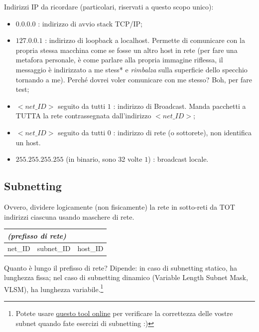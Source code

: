 \noindent Indirizzi IP da ricordare (particolari, riservati a questo scopo unico):
\begin{itemize}
    \item $0.0.0.0$ : indirizzo di avvio stack TCP/IP;
    \item $127.0.0.1$ : indirizzo di loopback a localhost. Permette di comunicare con la propria stessa macchina come se fosse un altro host in rete (per fare una metafora personale, è come parlare alla propria immagine riflessa, il messaggio è indirizzato a me stess* e \textit{rimbalza} sulla superficie dello specchio tornando a me). Perché dovrei voler comunicare con me stesso? Boh, per fare test;
    \item $<net\_ID>$ seguito da tutti $1$ : indirizzo di Broadcast. Manda pacchetti a TUTTA la rete contrassegnata dall'indirizzo $<net\_ID>$;
    \item $<net\_ID>$ seguito da tutti $0$ : indirizzo di rete (o sottorete), non identifica un host.
    \item $255.255.255.255$ (in binario, sono 32 volte $1$) : broadcast locale.
\end{itemize}
\newpage
{}
\subsection*{Subnetting}
\noindent Ovvero, dividere logicamente (non fisicamente) la rete in sotto-reti da TOT indirizzi ciascuna usando maschere di rete.

\begin{table}[h]
\centering
\begin{tabular}{|ll|l|}
\hline
\multicolumn{2}{|l|}{\textit{(prefisso di rete)}} &          \\ \hline
\multicolumn{1}{|c|}{net\_ID}     & subnet\_ID    & host\_ID \\ \hline
\end{tabular}
\end{table}

\noindent Quanto è lungo il prefisso di rete? Dipende: in caso di subnetting statico, ha lunghezza fissa; nel caso di subnetting dinamico (Variable Length Subnet Mask, VLSM), ha lunghezza variabile.\footnote{Potete usare \href{https://subnettingpractice.com/vlsm.html}{questo tool online} per verificare la correttezza delle vostre subnet quando fate esercizi di subnetting :)}\\

